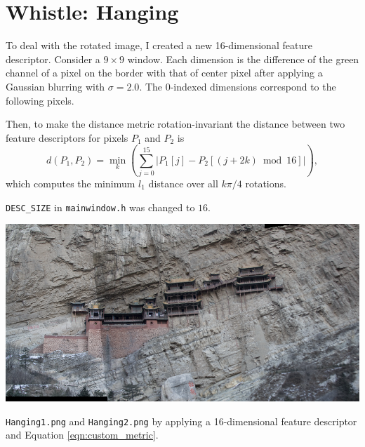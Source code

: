 \documentclass[letterpaper]{article}
\begin{document}
\section*{Whistle: Hanging}

To deal with the rotated image, I created a new 16-dimensional feature
descriptor. Consider a $9 \times 9$ window. Each dimension is the difference of
the green channel of a pixel on the border with that of center pixel after
applying a Gaussian blurring with $\sigma = 2.0$. The $0$-indexed dimensions
correspond to the following pixels.

\begin{center}
  \hspace{0.25cm}
\end{center}

Then, to make the distance metric rotation-invariant the distance between two
feature descriptors for pixels $P_1$ and $P_2$ is
\begin{equation}
  d\left(P_1,P_2\right) = \min_k\left(
    \sum_{j=0}^{15}\left\lvert
      P_1\left[j\right] - P_2\left[\left(j + 2k\right) \bmod 16\right]
      \right\rvert
    \right),
    \label{eqn:custom_metric}
\end{equation}
which computes the minimum $l_1$ distance over all $k\pi/4$ rotations.

\texttt{DESC\_SIZE} in \texttt{mainwindow.h} was changed to $16$.

\begin{center}
  \includegraphics[width=\textwidth]{hanging.png}

  \texttt{Hanging1.png} and \texttt{Hanging2.png} by applying a 16-dimensional
  feature descriptor and Equation \ref{eqn:custom_metric}.
\end{center}
\end{document}
